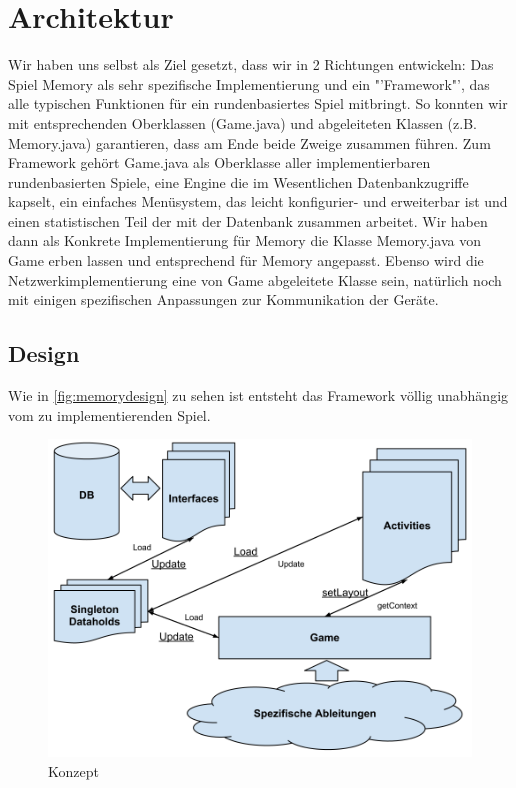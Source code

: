 \documentclass[11pt,a4paper]{article}
\begin{document}
\section {Architektur}
Wir haben uns selbst als Ziel gesetzt, dass wir in 2 Richtungen entwickeln: Das Spiel Memory als sehr spezifische Implementierung und ein "'Framework"', das alle typischen Funktionen für ein rundenbasiertes Spiel mitbringt. So konnten wir mit entsprechenden Oberklassen (Game.java) und abgeleiteten Klassen (z.B. Memory.java) garantieren, dass am Ende beide Zweige zusammen führen.
Zum Framework gehört Game.java als Oberklasse aller implementierbaren rundenbasierten Spiele, eine Engine die im Wesentlichen Datenbankzugriffe kapselt, ein einfaches Menüsystem, das leicht konfigurier- und erweiterbar ist und einen statistischen Teil der mit der Datenbank zusammen arbeitet. Wir haben dann als Konkrete Implementierung für Memory die Klasse Memory.java von Game erben lassen und entsprechend für Memory angepasst. Ebenso wird die Netzwerkimplementierung eine von Game abgeleitete Klasse sein, natürlich noch mit einigen spezifischen Anpassungen zur Kommunikation der Geräte.\\\subsection{Design}
Wie in \autoref{fig:memorydesign} zu sehen ist entsteht das Framework völlig unabhängig vom zu implementierenden Spiel.
\begin{figure}[!h]
\centering
\includegraphics[scale=0.4]{pics/memorydesign.png}
\caption{Konzept}
\label{fig:memorydesign}
\end{figure}\\
\end{document}
